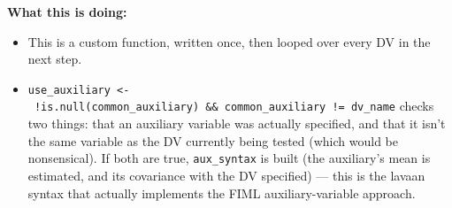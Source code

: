 \documentclass[
  letterpaper,
  DIV=11,
  numbers=noendperiod]{scrreprt}
\newenvironment{Shaded}{\begin{snugshade}}{\end{snugshade}}
\newcommand{\AttributeTok}[1]{\textcolor[rgb]{0.40,0.45,0.13}{#1}}
\newcommand{\ConstantTok}[1]{\textcolor[rgb]{0.56,0.35,0.01}{#1}}
\newcommand{\DecValTok}[1]{\textcolor[rgb]{0.68,0.00,0.00}{#1}}
\newcommand{\FunctionTok}[1]{\textcolor[rgb]{0.28,0.35,0.67}{#1}}
\newcommand{\NormalTok}[1]{\textcolor[rgb]{0.00,0.23,0.31}{#1}}
\newcommand{\SpecialCharTok}[1]{\textcolor[rgb]{0.37,0.37,0.37}{#1}}
\providecommand{\tightlist}{%
  \setlength{\itemsep}{0pt}\setlength{\parskip}{0pt}}\usepackage{longtable,booktabs,array}
\begin{document}
\begin{Shaded}
\end{Shaded}

\textbf{What this is doing:}

\begin{itemize}
\tightlist
\item
  This is a custom function, written once, then looped over every DV in
  the next step.
\end{itemize}

\begin{itemize}
\tightlist
\item
  \texttt{use\_auxiliary\ \textless{}-\ !is.null(common\_auxiliary)\ \&\&\ common\_auxiliary\ !=\ dv\_name}
  checks two things: that an auxiliary variable was actually specified,
  and that it isn't the same variable as the DV currently being tested
  (which would be nonsensical). If both are true, \texttt{aux\_syntax}
  is built (the auxiliary's mean is estimated, and its covariance with
  the DV specified) --- this is the lavaan syntax that actually
  implements the FIML auxiliary-variable approach.
\end{itemize}
\end{document}
